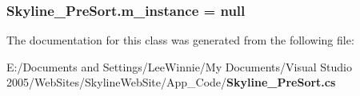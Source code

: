 \subsubsection{ {\bf Skyline\_\-Pre\-Sort.m\_\-instance} = null\hspace{0.3cm}{\tt  [static, private]}}\label{class_skyline___pre_sort_4fb45f0af53fb09f6a35405c3eb43d34}




The documentation for this class was generated from the following file:\begin{CompactItemize}
\item 
E:/Documents and Settings/Lee\-Winnie/My Documents/Visual Studio 2005/Web\-Sites/Skyline\-Web\-Site/App\_\-Code/{\bf Skyline\_\-Pre\-Sort.cs}\end{CompactItemize}
